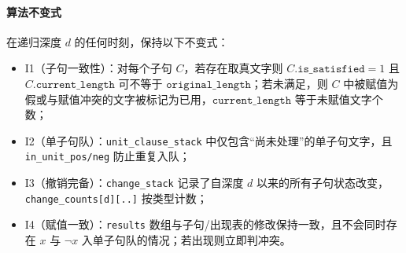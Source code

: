 \documentclass[UTF8]{ctexart}
\begin{document}
\paragraph{算法不变式}
在递归深度 \(d\) 的任何时刻，保持以下不变式：
\begin{itemize}
  \item I1（子句一致性）：对每个子句 \(C\)，若存在取真文字则 \(C.\texttt{is\_satisfied}=1\) 且 \(C.\texttt{current\_length}\) 可不等于 \(\texttt{original\_length}\)；若未满足，则 \(C\) 中被赋值为假或与赋值冲突的文字被标记为已用，\(\texttt{current\_length}\) 等于未赋值文字个数；
  \item I2（单子句队）：\texttt{unit\_clause\_stack} 中仅包含“尚未处理”的单子句文字，且 \texttt{in\_unit\_pos/neg} 防止重复入队；
  \item I3（撤销完备）：\texttt{change\_stack} 记录了自深度 \(d\) 以来的所有子句状态改变，\texttt{change\_counts[d][..]} 按类型计数；
  \item I4（赋值一致）：\texttt{results} 数组与子句/出现表的修改保持一致，且不会同时存在 \(x\) 与 \(\lnot x\) 入单子句队的情况；若出现则立即判冲突。
\end{itemize}
\end{document}
